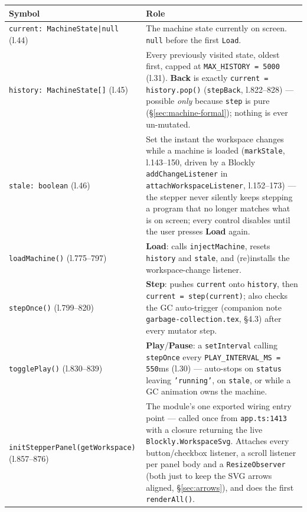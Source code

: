 \documentclass[11pt]{article}
\begin{document}
\begin{center}
\begin{longtable}{@{}p{3.6cm}p{11.6cm}@{}}
\toprule
\textbf{Symbol} & \textbf{Role} \\
\midrule
\endhead
\texttt{current: MachineState|null} (l.44) &
  The machine state currently on screen. \texttt{null} before the first
  \texttt{Load}. \\
\texttt{history: MachineState[]} (l.45) &
  Every previously visited state, oldest first, capped at
  \texttt{MAX\_HISTORY = 5000} (l.31). \textbf{Back} is exactly
  \texttt{current = history.pop()} (\texttt{stepBack}, l.822--828) ---
  possible \emph{only} because \texttt{step} is pure
  (\S\ref{sec:machine-formal}); nothing is ever un-mutated. \\
\texttt{stale: boolean} (l.46) &
  Set the instant the workspace changes while a machine is loaded
  (\texttt{markStale}, l.143--150, driven by a Blockly
  \texttt{addChangeListener} in \texttt{attachWorkspaceListener},
  l.152--173) --- the stepper never silently keeps stepping a program that
  no longer matches what is on screen; every control disables until the
  user presses \textbf{Load} again. \\
\texttt{loadMachine()} (l.775--797) &
  \textbf{Load}: calls \texttt{injectMachine}, resets \texttt{history} and
  \texttt{stale}, and (re)installs the workspace-change listener. \\
\texttt{stepOnce()} (l.799--820) &
  \textbf{Step}: pushes \texttt{current} onto \texttt{history}, then
  \texttt{current = step(current)}; also checks the GC auto-trigger
  (companion note \texttt{garbage-collection.tex}, \S4.3) after every
  mutator step. \\
\texttt{togglePlay()} (l.830--839) &
  \textbf{Play}/\textbf{Pause}: a \texttt{setInterval} calling
  \texttt{stepOnce} every \texttt{PLAY\_INTERVAL\_MS = 550}ms (l.30) ---
  auto-stops on \texttt{status} leaving \texttt{'running'}, on
  \texttt{stale}, or while a GC animation owns the machine. \\
\texttt{initStepperPanel(}\linebreak\texttt{getWorkspace)} (l.857--876) &
  The module's one exported wiring entry point --- called once from
  \texttt{app.ts:1413} with a closure returning the live
  \texttt{Blockly.WorkspaceSvg}. Attaches every button/checkbox listener,
  a scroll listener per panel body and a \texttt{ResizeObserver} (both
  just to keep the SVG arrows aligned, \S\ref{sec:arrows}), and does the
  first \texttt{renderAll()}. \\
\bottomrule
\end{longtable}
\end{center}
\end{document}

